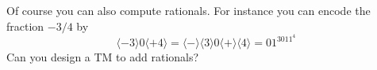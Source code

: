 Of course you can also compute rationals. For instance you
 can encode the fraction $-3/4$ by
 \[
 \langle -3 \rangle 0 \langle +4 \rangle
 = \langle - \rangle \langle 3 \rangle 0 \langle + \rangle \langle 4 \rangle
 = 01^3011^4
 \]
 Can you design a TM to add rationals?
